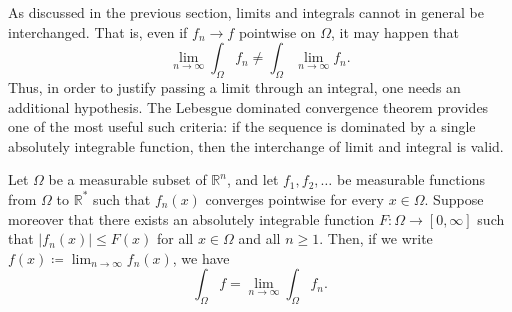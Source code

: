 As discussed in the previous section, limits and integrals cannot in general be interchanged. That is, even if \(f_n \to f\) pointwise on \(\Omega\), it may happen that 
\[
    \lim_{n \to \infty} \int _\Omega f_n \neq \int _\Omega \lim_{n \to \infty} f_n.  
\]  
Thus, in order to justify passing a limit through an integral, one needs an additional hypothesis. The Lebesgue dominated convergence theorem provides one of the most useful such criteria: if the sequence is dominated by a single absolutely integrable function, then the interchange of limit and integral is valid. 

\begin{theorem}
    Let \(\Omega \) be a measurable subset of \(\mathbb{R} ^n\), and let \(f_1, f_2, \dots\) be measurable functions from \(\Omega\) to \(\mathbb{R} ^*\) such that \(f_n(x)\) converges pointwise for every \(x \in \Omega\). Suppose moreover that there exists an absolutely integrable function \(F: \Omega \to [0, \infty]\) such that \(\vert f_n(x) \vert \le F(x) \) for all \(x \in \Omega\) and all \(n \ge 1\). Then, if we write \(f(x) \coloneqq \lim_{n \to \infty} f_n (x)  \), we have
    \[
        \int _\Omega f = \lim_{n \to \infty} \int _\Omega f_n.
    \]            
\end{theorem}


